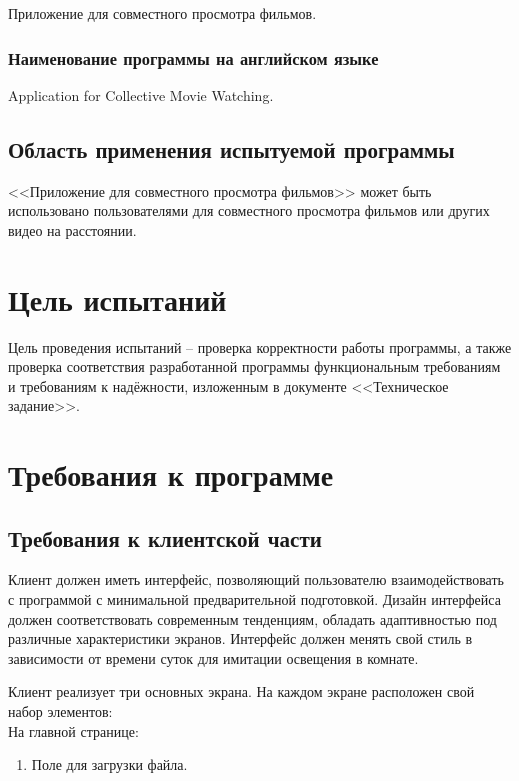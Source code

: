 \documentclass{../../includes/TechDocMultiAuthors}
\begin{document}
    Приложение для совместного просмотра фильмов.

    \subsubsection{Наименование программы на английском языке}

    Application for Collective Movie Watching.

    \subsection{Область применения испытуемой программы}

    <<Приложение для совместного просмотра фильмов>> может быть использовано пользователями для совместного просмотра фильмов или других видео на расстоянии.

    \section{Цель испытаний}

    Цель проведения испытаний -- проверка корректности работы программы, а также проверка соответствия разработанной программы функциональным требованиям и требованиям к надёжности, изложенным в документе <<Техническое задание>>.

    \section{Требования к программе}

    \subsection{Требования к клиентской части}
    Клиент должен иметь интерфейс, позволяющий пользователю взаимодействовать с программой с минимальной предварительной
    подготовкой.
    Дизайн интерфейса должен соответствовать современным тенденциям, обладать адаптивностью под различные характеристики
    экранов.
    Интерфейс должен менять свой стиль в зависимости от времени суток для имитации освещения в комнате.

    Клиент реализует три основных экрана.
    На каждом экране расположен свой набор элементов:\\

    На главной странице:
    \begin{enumerate}[noitemsep]
        \item Поле для загрузки файла.
    \end{enumerate}
\end{document}
